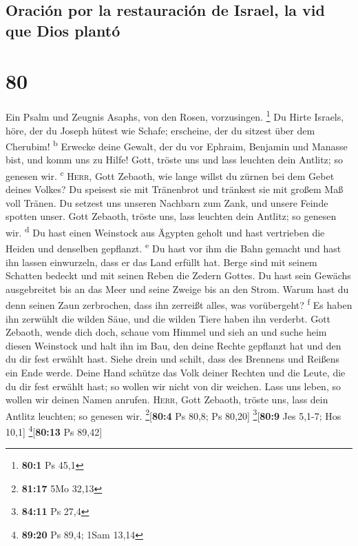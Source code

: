 \hypertarget{oraciuxf3n-por-la-restauraciuxf3n-de-israel-la-vid-que-dios-plantuxf3}{%
\subsection{Oración por la restauración de Israel, la vid que Dios
plantó}\label{oraciuxf3n-por-la-restauraciuxf3n-de-israel-la-vid-que-dios-plantuxf3}}

\hypertarget{section-79}{%
\section{80}\label{section-79}}

 Ein Psalm und Zeugnis Asaphs, von den Rosen, vorzusingen.
\footnote{\textbf{80:1} Ps 45,1}  Du Hirte Israels, höre,
der du Joseph hütest wie Schafe; erscheine, der du sitzest über dem
Cherubim! \textsuperscript{b}  Erwecke deine Gewalt, der
du vor Ephraim, Benjamin und Manasse bist, und komm uns zu Hilfe!
 Gott, tröste uns und lass leuchten dein Antlitz; so
genesen wir. \textsuperscript{c}  \textsc{Herr}, Gott
Zebaoth, wie lange willst du zürnen bei dem Gebet deines Volkes?
 Du speisest sie mit Tränenbrot und tränkest sie mit
großem Maß voll Tränen.  Du setzest uns unseren Nachbarn
zum Zank, und unsere Feinde spotten unser.  Gott Zebaoth,
tröste uns, lass leuchten dein Antlitz; so genesen wir.
\textsuperscript{d}  Du hast einen Weinstock aus Ägypten
geholt und hast vertrieben die Heiden und denselben gepflanzt.
\textsuperscript{e}  Du hast vor ihm die Bahn gemacht und
hast ihn lassen einwurzeln, dass er das Land erfüllt hat.
 Berge sind mit seinem Schatten bedeckt und mit seinen
Reben die Zedern Gottes.  Du hast sein Gewächs
ausgebreitet bis an das Meer und seine Zweige bis an den Strom.
 Warum hast du denn seinen Zaun zerbrochen, dass ihn
zerreißt alles, was vorübergeht? \textsuperscript{f}  Es
haben ihn zerwühlt die wilden Säue, und die wilden Tiere haben ihn
verderbt.  Gott Zebaoth, wende dich doch, schaue vom
Himmel und sieh an und suche heim diesen Weinstock  und
halt ihn im Bau, den deine Rechte gepflanzt hat und den du dir fest
erwählt hast.  Siehe drein und schilt, dass des Brennens
und Reißens ein Ende werde.  Deine Hand schütze das Volk
deiner Rechten und die Leute, die du dir fest erwählt hast;
 so wollen wir nicht von dir weichen. Lass uns leben, so
wollen wir deinen Namen anrufen.  \textsc{Herr}, Gott
Zebaoth, tröste uns, lass dein Antlitz leuchten; so genesen wir.
\footnote{\textbf{81:17} 5Mo 32,13}{[}\textbf{80:4} Ps 80,8; Ps 80,20{]}
\footnote{\textbf{84:11} Ps 27,4}{[}\textbf{80:9} Jes 5,1-7; Hos 10,1{]}
\footnote{\textbf{89:20} Ps 89,4; 1Sam 13,14}{[}\textbf{80:13} Ps
89,42{]}

